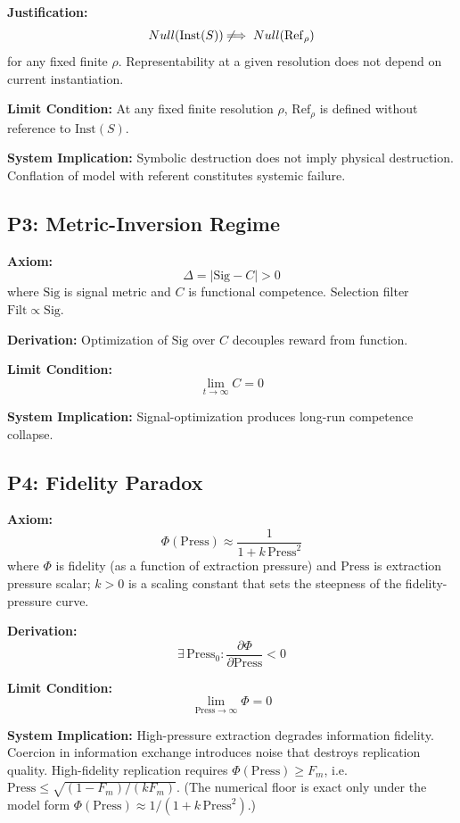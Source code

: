\documentclass{article}
\newcommand{\Sig}{\mathrm{Sig}}
\newcommand{\Press}{\mathrm{Press}}
\newcommand{\PhysRef}{\mathrm{Ref}}
\newcommand{\Filt}{\mathrm{Filt}}
\begin{document}
\textbf{Justification:}
\[ Null(\mathrm{Inst}(S)) \not\!\!\implies Null(\PhysRef_{\rho}) \]
for any fixed finite $\rho$. Representability at a given resolution does not depend on
current instantiation.

\textbf{Limit Condition:}
At any fixed finite resolution $\rho$, $\PhysRef_{\rho}$ is defined without reference to $\mathrm{Inst}(S)$.

\textbf{System Implication:} Symbolic destruction does not imply physical destruction.
Conflation of model with referent constitutes systemic failure.

\bigskip

\subsection*{P3: Metric-Inversion Regime}

\textbf{Axiom:}
\[ \Delta = |\Sig - C| > 0 \]
where $\Sig$ is signal metric and $C$ is functional competence. Selection filter
$\Filt \propto \Sig$.

\textbf{Derivation:} Optimization of $\Sig$ over $C$ decouples reward from function.

\textbf{Limit Condition:}
\[ \lim_{t \to \infty} C = 0 \]

\textbf{System Implication:} Signal-optimization produces long-run competence collapse.

\bigskip

\subsection*{P4: Fidelity Paradox}

\textbf{Axiom:}
\[ \Phi(\Press) \approx \frac{1}{1 + k\,\Press^2} \]
where $\Phi$ is fidelity (as a function of extraction pressure) and $\Press$ is extraction pressure scalar; $k > 0$ is a scaling constant that sets the steepness of the fidelity-pressure curve.

\textbf{Derivation:}
\[ \exists\, \Press_0 : \frac{\partial \Phi}{\partial \Press} < 0 \]

\textbf{Limit Condition:}
\[ \lim_{\Press \to \infty} \Phi = 0 \]

\textbf{System Implication:} High-pressure extraction degrades information fidelity.
Coercion in information exchange introduces noise that destroys replication quality.
High-fidelity replication requires $\Phi(\Press) \ge F_m$, i.e.\ $\Press \le \sqrt{(1-F_m)/(k F_m)}$.
(The numerical floor is exact only under the model form $\Phi(\Press) \approx 1/(1+k\,\Press^2)$.)
\end{document}
